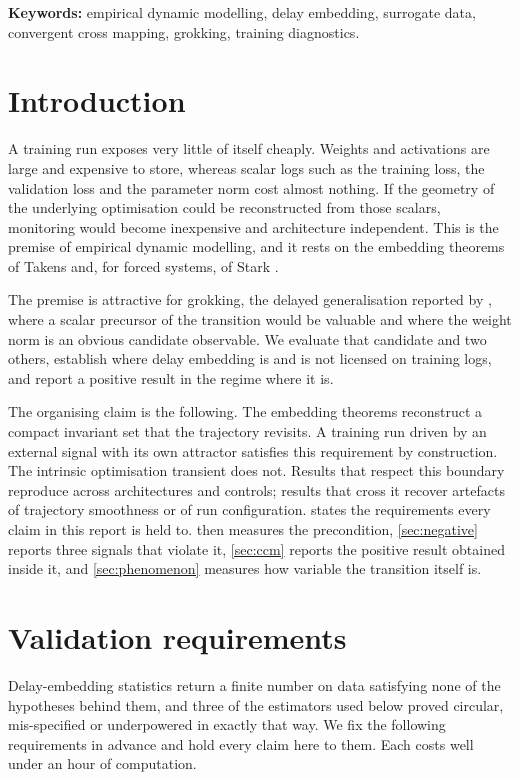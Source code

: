 \documentclass{article}
\begin{document}
\textbf{Keywords:} empirical dynamic modelling, delay embedding, surrogate data,
convergent cross mapping, grokking, training diagnostics.

\section{Introduction}\label{sec:intro}

A training run exposes very little of itself cheaply. Weights and activations are large
and expensive to store, whereas scalar logs such as the training loss, the validation
loss and the parameter norm cost almost nothing. If the geometry of the underlying
optimisation could be reconstructed from those scalars, monitoring would become
inexpensive and architecture independent. This is the premise of empirical dynamic
modelling, and it rests on the embedding theorems of Takens \citep{takens1981detecting}
and, for forced systems, of Stark \citep{stark1999delay, stark2003delay}.

The premise is attractive for grokking, the delayed generalisation reported by
\citet{power2022grokking}, where a scalar precursor of the transition would be valuable
and where the weight norm is an obvious candidate observable. We evaluate that candidate
and two others, establish where delay embedding is and is not licensed on training logs,
and report a positive result in the regime where it is.

The organising claim is the following. The embedding theorems reconstruct a compact
invariant set that the trajectory revisits. A training run driven by an external signal
with its own attractor satisfies this requirement by construction. The intrinsic
optimisation transient does not. Results that respect this boundary reproduce across
architectures and controls; results that cross it recover artefacts of trajectory
smoothness or of run configuration.  states the requirements every
claim in this report is held to.  then measures the precondition,
\cref{sec:negative} reports three signals that violate it, \cref{sec:ccm} reports the
positive result obtained inside it, and \cref{sec:phenomenon} measures how variable the
transition itself is.

\section{Validation requirements}\label{sec:protocol}

Delay-embedding statistics return a finite number on data satisfying none of the hypotheses
behind them, and three of the estimators used below proved circular, mis-specified or
underpowered in exactly that way. We fix the following requirements in advance and hold
every claim here to them. Each costs well under an hour of computation.
\end{document}
